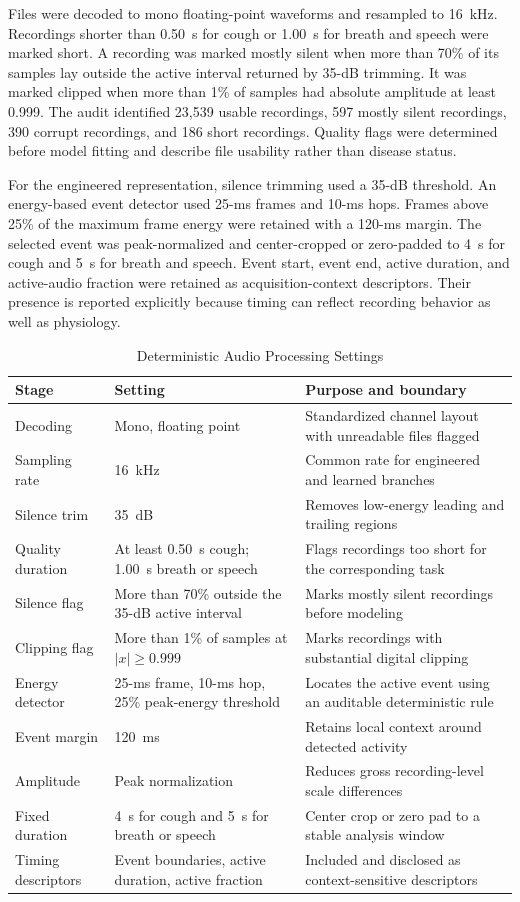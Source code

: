 \documentclass[journal]{IEEEtran}
\begin{document}
Files were decoded to mono floating-point waveforms and resampled to 16~kHz. Recordings shorter than 0.50~s for cough or 1.00~s for breath and speech were marked short. A recording was marked mostly silent when more than 70\% of its samples lay outside the active interval returned by 35-dB trimming. It was marked clipped when more than 1\% of samples had absolute amplitude at least 0.999. The audit identified 23,539 usable recordings, 597 mostly silent recordings, 390 corrupt recordings, and 186 short recordings. Quality flags were determined before model fitting and describe file usability rather than disease status.

For the engineered representation, silence trimming used a 35-dB threshold. An energy-based event detector used 25-ms frames and 10-ms hops. Frames above 25\% of the maximum frame energy were retained with a 120-ms margin. The selected event was peak-normalized and center-cropped or zero-padded to 4~s for cough and 5~s for breath and speech. Event start, event end, active duration, and active-audio fraction were retained as acquisition-context descriptors. Their presence is reported explicitly because timing can reflect recording behavior as well as physiology.

\begin{table}[t]
\caption{Deterministic Audio Processing Settings}
\label{tab:s_audio_settings}
\centering
\footnotesize
\begin{tabular}{L{3.0cm}L{3.0cm}L{7.3cm}}
\toprule
Stage & Setting & Purpose and boundary \\
\midrule
Decoding & Mono, floating point & Standardized channel layout with unreadable files flagged \\
Sampling rate & 16~kHz & Common rate for engineered and learned branches \\
Silence trim & 35~dB & Removes low-energy leading and trailing regions \\
Quality duration & At least 0.50~s cough; 1.00~s breath or speech & Flags recordings too short for the corresponding task \\
Silence flag & More than 70\% outside the 35-dB active interval & Marks mostly silent recordings before modeling \\
Clipping flag & More than 1\% of samples at $|x|\geq0.999$ & Marks recordings with substantial digital clipping \\
Energy detector & 25-ms frame, 10-ms hop, 25\% peak-energy threshold & Locates the active event using an auditable deterministic rule \\
Event margin & 120~ms & Retains local context around detected activity \\
Amplitude & Peak normalization & Reduces gross recording-level scale differences \\
Fixed duration & 4~s for cough and 5~s for breath or speech & Center crop or zero pad to a stable analysis window \\
Timing descriptors & Event boundaries, active duration, active fraction & Included and disclosed as context-sensitive descriptors \\
\bottomrule
\end{tabular}
\end{table}
\end{document}
